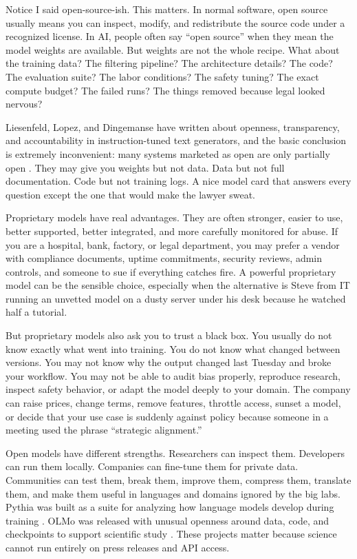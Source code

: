 \documentclass[12pt,oneside]{book}
\begin{document}
Notice I said open-source-ish. This matters. In normal software, open source usually means you can inspect, modify, and redistribute the source code under a recognized license. In AI, people often say ``open source'' when they mean the model weights are available. But weights are not the whole recipe. What about the training data? The filtering pipeline? The architecture details? The code? The evaluation suite? The labor conditions? The safety tuning? The exact compute budget? The failed runs? The things removed because legal looked nervous?

Liesenfeld, Lopez, and Dingemanse have written about openness, transparency, and accountability in instruction-tuned text generators, and the basic conclusion is extremely inconvenient: many systems marketed as open are only partially open \parencite{liesenfeld2023}. They may give you weights but not data. Data but not full documentation. Code but not training logs. A nice model card that answers every question except the one that would make the lawyer sweat.

Proprietary models have real advantages. They are often stronger, easier to use, better supported, better integrated, and more carefully monitored for abuse. If you are a hospital, bank, factory, or legal department, you may prefer a vendor with compliance documents, uptime commitments, security reviews, admin controls, and someone to sue if everything catches fire. A powerful proprietary model can be the sensible choice, especially when the alternative is Steve from IT running an unvetted model on a dusty server under his desk because he watched half a tutorial.

But proprietary models also ask you to trust a black box. You usually do not know exactly what went into training. You do not know what changed between versions. You may not know why the output changed last Tuesday and broke your workflow. You may not be able to audit bias properly, reproduce research, inspect safety behavior, or adapt the model deeply to your domain. The company can raise prices, change terms, remove features, throttle access, sunset a model, or decide that your use case is suddenly against policy because someone in a meeting used the phrase ``strategic alignment.''

Open models have different strengths. Researchers can inspect them. Developers can run them locally. Companies can fine-tune them for private data. Communities can test them, break them, improve them, compress them, translate them, and make them useful in languages and domains ignored by the big labs. Pythia was built as a suite for analyzing how language models develop during training \parencite{biderman2023}. OLMo was released with unusual openness around data, code, and checkpoints to support scientific study \parencite{groeneveld2024}. These projects matter because science cannot run entirely on press releases and API access.
\end{document}
